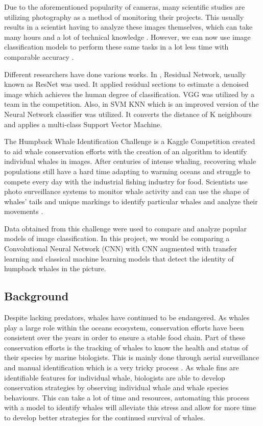 \documentclass[paper=a4, fontsize=11pt]{scrartcl}
\numberwithin{equation}{section}		%
\numberwithin{table}{section}				%
\begin{document}
Due to the aforementioned popularity of cameras, many scientific studies are utilizing photography as a method of monitoring their projects. This usually results in a scientist having to analyze these images themselves, which can take many hours and a lot of technical knowledge \cite{JaisakthiS.M.2017Awms}. However, we can now use image classification models to perform these same tasks in a lot less time with comparable accuracy \cite{JaisakthiS.M.2017Awms}.

Different researchers have done various works. In \cite{he2016deep}, Residual Network, usually known as ResNet was used. It applied residual sections to estimate a denoised image which achieves the human degree of classification. VGG was utilized by a team in the competition\cite{simonyan2014very}. Also, in \cite{zhang2006svm} SVM KNN which is an improved version of the Neural Network classifier was utilized. It converts the distance of K neighbours and applies a multi-class Support Vector Machine. 

The Humpback Whale Identification Challenge is a Kaggle Competition created to aid whale conservation efforts with the creation of an algorithm to identify individual whales in images. After centuries of intense whaling, recovering whale populations still have a hard time adapting to warming oceans and struggle to compete every day with the industrial fishing industry for food. Scientists use photo surveillance systems to monitor whale activity and can use the shape of whales’ tails and unique markings to identify particular whales and analyze their movements \cite{JaisakthiS.M.2017Awms}.

Data obtained from this challenge were used to compare and analyze popular models of image classification. In this project, we would be comparing a Convolutional Neural Network (CNN) with CNN augmented with transfer learning and classical machine learning models that detect the identity of humpback whales in the picture.



\subsection{Background}\label{sec: background}
Despite lacking predators, whales have continued to be endangered. As whales play a large role within the oceans ecosystem, conservation efforts have been consistent over the years in order to ensure a stable food chain. Part of these conservation efforts is the tracking of whales to know the health and status of their species by marine biologists. This is mainly done through aerial surveillance and manual identification which is a very tricky process \cite{JaisakthiS.M.2017Awms}. As whale fins are identifiable features for individual whale, biologists are able to develop conservation strategies by observing individual whale and whale species behaviours. This can take a lot of time and resources, automating this process with a model to identify whales will alleviate this stress and allow for more time to develop better strategies for the continued survival of whales.
\end{document}
